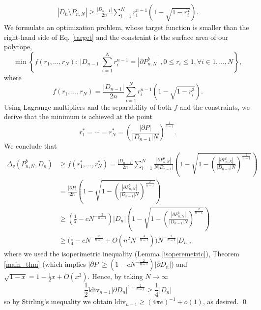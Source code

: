 \documentclass[10pt, twoside, leqno]{article}
\theoremstyle{definition}
\numberwithin{equation}{section}
\newcommand{\NN}{N^{-\frac 2{n-1} }}
\begin{document}
\begin{align}\label{target}
|D_n\setminus P_{n,N}| \geq \frac {|D_{n-1}|}{2n}\sum_{i=1}^{N}r_i^{n-1}\left(1-\sqrt{1-r_{i}^{2}}\right).
\end{align} 
We formulate an optimization problem, whose target function is smaller than the right-hand side of Eq. \eqref{target} and the constraint is the surface area of our polytope,
\[
\min\left\{f\left(r_1,\ldots,r_N\right) :\ |D_{n-1}|\sum_{i=1}^{N}r_{i}^{n-1}=|\partial P^b_{n,N}| \ ,0\leq r_{i}\leq 1  ,\forall i\in1,\ldots,N\right\},
\]
where
\[
f\left(r_1,\ldots,r_N\right) = \frac{|D_{n-1}|}{2n}\sum_{i=1}^{N}r_{i}^{n-1}\left(1-\sqrt{1-r_{i}^{2}}\right).
\]
Using  Lagrange multipliers and the separability of both $ f$ and the constraints, we derive that the minimum is achieved at the point 
\[
r^*_1=\cdots=r^*_N = \left(\frac{|\partial P|}{|D_{n-1}|N}\right)^{\frac 1{n-1}}. 
\]
We conclude that
\begin{equation}
\begin{aligned}\Delta_{v}(P_{n,N}^{b},D_{n}) & \geq f\left(r_{1}^{*},\ldots,r_{N}^{*}\right)=\frac{|D_{n-1}|}{2n}\sum_{i=1}^{N}\frac{|\partial P_{n,N}^{b}|}{N|D_{n-1}|}\left(1-\sqrt{1-\left(\frac{|\partial P_{n,N}^{b}|}{|D_{n-1}|N}\right)^{\frac{2}{n-1}}}\right)\\
& =\frac{|\partial P|}{2n}\left(1-\sqrt{1-\left(\frac{|\partial P_{n,N}^{b}|}{|D_{n-1}|N}\right)^{\frac{2}{n-1}}}\right)\\
& \geq(\frac{1}{2}-c\NN)|D_{n}|\left(1-\sqrt{1-\left(\frac{|\partial P_{n,N}^{b}|}{|D_{n-1}|N}\right)^{\frac{2}{n-1}}}\right)\\
& \geq\bigg(\frac{1}{4}-c\NN+O(n^{2}N^{-\frac{4}{n-1}})\bigg)\NN|D_{n}|,
\end{aligned}
\end{equation}
where we used the isoperimetric inequality (Lemma \ref{isoperemetric}), Theorem \ref{main_thm} (which implies $ |\partial P| \geq (1-c\NN) |\partial D_n|$) and $ \sqrt{1-x} = 1-\frac{1}{2}x+O(x^2). $ Hence, by taking $ N \to \infty $ 
\[
\frac 12\text{ldiv}_{n-1}|\partial D_n|^{1+\frac{2}{n-1}} \geq \frac{1}{4}|D_{n}|
\]
so by Stirling's inequality we obtain $ \text{ldiv}_{n-1} \geq (4\pi e)^{-1} + o(1)$, as desired.
\qed
\end{document}
